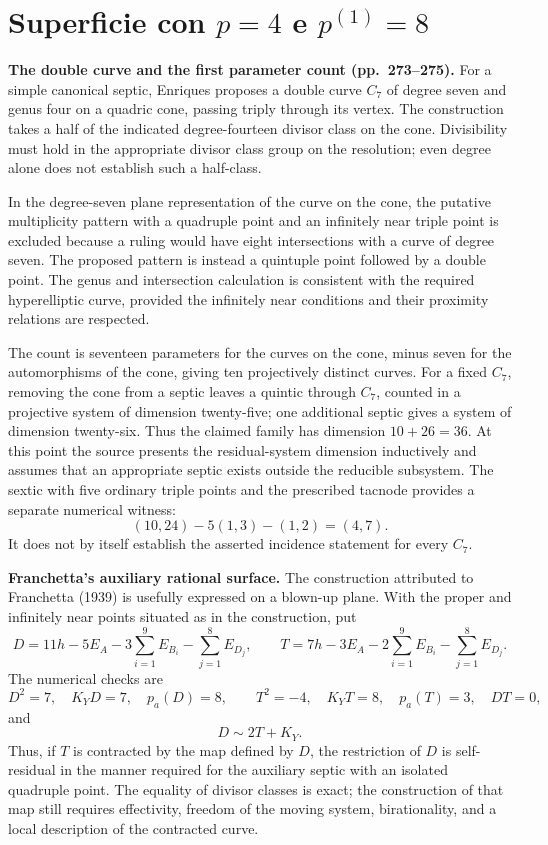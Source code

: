 \section{Superficie con \texorpdfstring{$p=4$}{p=4} e \texorpdfstring{$p^{(1)}=8$}{p(1)=8}}
\label{cp2-viii-4}

\textbf{The double curve and the first parameter count (pp.~273--275).}
For a simple canonical septic, Enriques proposes a double curve \(C_7\) of degree seven and genus four on a quadric cone, passing triply through its vertex. The construction takes a half of the indicated degree-fourteen divisor class on the cone. Divisibility must hold in the appropriate divisor class group on the resolution; even degree alone does not establish such a half-class.

In the degree-seven plane representation of the curve on the cone, the putative multiplicity pattern with a quadruple point and an infinitely near triple point is excluded because a ruling would have eight intersections with a curve of degree seven. The proposed pattern is instead a quintuple point followed by a double point. The genus and intersection calculation is consistent with the required hyperelliptic curve, provided the infinitely near conditions and their proximity relations are respected.

The count is seventeen parameters for the curves on the cone, minus seven for the automorphisms of the cone, giving ten projectively distinct curves. For a fixed \(C_7\), removing the cone from a septic leaves a quintic through \(C_7\), counted in a projective system of dimension twenty-five; one additional septic gives a system of dimension twenty-six. Thus the claimed family has dimension \(10+26=36\). At this point the source presents the residual-system dimension inductively and assumes that an appropriate septic exists outside the reducible subsystem. The sextic with five ordinary triple points and the prescribed tacnode provides a separate numerical witness:
\[
(10,24)-5(1,3)-(1,2)=(4,7).
\]
It does not by itself establish the asserted incidence statement for every \(C_7\).

\textbf{Franchetta's auxiliary rational surface.}
The construction attributed to Franchetta (1939) is usefully expressed on a blown-up plane. With the proper and infinitely near points situated as in the construction, put
\[
D=11h-5E_A-3\sum_{i=1}^9E_{B_i}-\sum_{j=1}^8E_{D_j},
\qquad
T=7h-3E_A-2\sum_{i=1}^9E_{B_i}-\sum_{j=1}^8E_{D_j}.
\]
The numerical checks are
\[
D^2=7,\quad K_YD=7,\quad p_a(D)=8,\qquad
T^2=-4,\quad K_YT=8,\quad p_a(T)=3,\quad DT=0,
\]
and
\[
D\sim2T+K_Y.
\]
Thus, if \(T\) is contracted by the map defined by \(D\), the restriction of \(D\) is self-residual in the manner required for the auxiliary septic with an isolated quadruple point. The equality of divisor classes is exact; the construction of that map still requires effectivity, freedom of the moving system, birationality, and a local description of the contracted curve.

